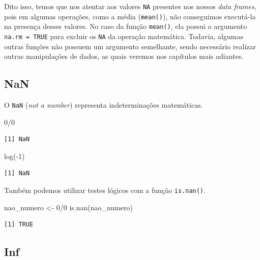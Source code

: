\documentclass[
  brazilian,
]{book}
\newenvironment{Shaded}{\begin{snugshade}}{\end{snugshade}}
\newcommand{\DecValTok}[1]{\textcolor[rgb]{0.00,0.00,0.81}{#1}}
\newcommand{\FunctionTok}[1]{\textcolor[rgb]{0.00,0.00,0.00}{#1}}
\newcommand{\NormalTok}[1]{#1}
\newcommand{\OtherTok}[1]{\textcolor[rgb]{0.56,0.35,0.01}{#1}}
\newcommand{\SpecialCharTok}[1]{\textcolor[rgb]{0.00,0.00,0.00}{#1}}
\begin{document}
Dito isso, temos que nos atentar aos valores \texttt{NA} presentes nos nossos \emph{data frames}, pois em algumas operações, como a média (\texttt{mean()}), não conseguimos executá-la na presença desses valores. No caso da função \texttt{mean()}, ela possui o argumento \texttt{na.rm\ =\ TRUE} para excluir os \texttt{NA} da operação matemática. Todavia, algumas outras funções não possuem um argumento semelhante, sendo necessário realizar outras manipulações de dados, as quais veremos nos capítulos mais adiantes.

\hypertarget{nan}{%
\subsection{NaN}\label{nan}}

O \texttt{NaN} (\emph{not a number}) representa indeterminações matemáticas.

\begin{Shaded}
\begin{Highlighting}[]
\DecValTok{0}\SpecialCharTok{/}\DecValTok{0}
\end{Highlighting}
\end{Shaded}

\begin{verbatim}
[1] NaN
\end{verbatim}

\begin{Shaded}
\begin{Highlighting}[]
\FunctionTok{log}\NormalTok{(}\SpecialCharTok{{-}}\DecValTok{1}\NormalTok{)}
\end{Highlighting}
\end{Shaded}

\begin{verbatim}
[1] NaN
\end{verbatim}

Também podemos utilizar testes lógicos com a função \texttt{is.nan()}.

\begin{Shaded}
\begin{Highlighting}[]
\NormalTok{nao\_numero }\OtherTok{\textless{}{-}} \DecValTok{0}\SpecialCharTok{/}\DecValTok{0}
\FunctionTok{is.nan}\NormalTok{(nao\_numero)}
\end{Highlighting}
\end{Shaded}

\begin{verbatim}
[1] TRUE
\end{verbatim}

\hypertarget{inf}{%
\subsection{Inf}\label{inf}}
\end{document}
